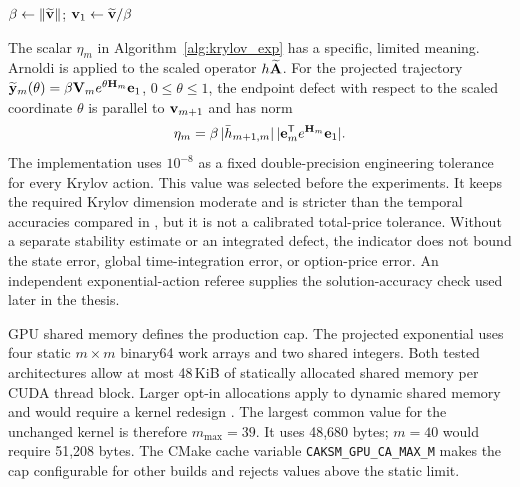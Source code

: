 \begin{algorithm}[p]
\singlespacing
\caption{Arnoldi Iteration for the Scaled Operator}
\label{alg:arnoldi}
$\beta \gets \|\widetilde{\mathbf{v}}\|$;\quad
$\mathbf{v}_1 \gets \widetilde{\mathbf{v}} / \beta$\;
\end{algorithm}

The scalar $\eta_m$ in Algorithm~\ref{alg:krylov_exp} has a specific, limited meaning. Arnoldi is applied to the scaled operator $h\widetilde{\mathbf{A}}$. For the projected
trajectory $\widetilde{\mathbf{y}}_m(\theta)=\beta\mathbf{V}_m
e^{\theta\mathbf{H}_m}\mathbf{e}_1$, $0\leq\theta\leq1$, the endpoint defect with respect to the scaled coordinate $\theta$ is parallel to $\mathbf{v}_{m+1}$ and has norm
\[
\eta_m=
\beta\,|\bar h_{m+1,m}|\,
|\mathbf{e}_m^{\mathsf T}e^{\mathbf{H}_m}\mathbf{e}_1|.
\]
The implementation uses $10^{-8}$ as a fixed double-precision engineering tolerance for every Krylov action. This value was selected before the experiments. It keeps the required Krylov dimension moderate and is stricter than the temporal accuracies compared in , but it is not a calibrated total-price tolerance. Without a separate stability estimate or an integrated defect, the indicator does not bound the state error, global time-integration error, or option-price error. An independent exponential-action referee supplies the solution-accuracy check used later in the thesis.

GPU shared memory defines the production cap. The projected exponential uses four static $m\times m$ binary64 work arrays and two shared integers. Both tested architectures allow at most 48\,KiB of statically allocated shared memory per CUDA thread block. Larger opt-in allocations apply to dynamic shared memory and would require a kernel redesign \cite{nvidia-cuda-guide}. The largest common value for the unchanged kernel is therefore $m_{\max}=39$. It uses 48{,}680 bytes; $m=40$ would require 51{,}208 bytes. The CMake cache variable \texttt{CAKSM\_GPU\_CA\_MAX\_M} makes the cap configurable for other builds and rejects values above the static limit.

